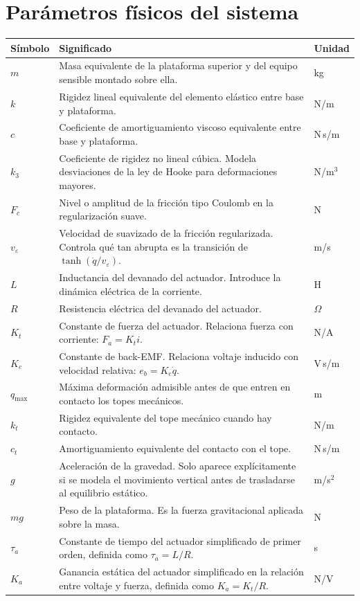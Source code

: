 \documentclass[11pt]{article}
\begin{document}
\section{Par\'ametros f\'isicos del sistema}

\begin{center}
\small
\begin{tabular}{>{\raggedright\arraybackslash}p{3.0cm} >{\raggedright\arraybackslash}p{9.0cm} >{\raggedright\arraybackslash}p{2.2cm}}
\toprule
\textbf{S\'imbolo} & \textbf{Significado} & \textbf{Unidad} \\
\midrule
$m$ & Masa equivalente de la plataforma superior y del equipo sensible montado sobre ella. & kg \\
$k$ & Rigidez lineal equivalente del elemento el\'astico entre base y plataforma. & N/m \\
$c$ & Coeficiente de amortiguamiento viscoso equivalente entre base y plataforma. & N\,s/m \\
$k_3$ & Coeficiente de rigidez no lineal c\'ubica. Modela desviaciones de la ley de Hooke para deformaciones mayores. & N/m$^3$ \\
$F_c$ & Nivel o amplitud de la fricci\'on tipo Coulomb en la regularizaci\'on suave. & N \\
$v_\varepsilon$ & Velocidad de suavizado de la fricci\'on regularizada. Controla qu\'e tan abrupta es la transici\'on de $\tanh(\dot q/v_\varepsilon)$. & m/s \\
$L$ & Inductancia del devanado del actuador. Introduce la din\'amica el\'ectrica de la corriente. & H \\
$R$ & Resistencia el\'ectrica del devanado del actuador. & $\Omega$ \\
$K_t$ & Constante de fuerza del actuador. Relaciona fuerza con corriente: $F_a=K_t i$. & N/A \\
$K_e$ & Constante de back-EMF. Relaciona voltaje inducido con velocidad relativa: $e_b=K_e\dot q$. & V\,s/m \\
$q_{\max}$ & M\'axima deformaci\'on admisible antes de que entren en contacto los topes mec\'anicos. & m \\
$k_t$ & Rigidez equivalente del tope mec\'anico cuando hay contacto. & N/m \\
$c_t$ & Amortiguamiento equivalente del contacto con el tope. & N\,s/m \\
$g$ & Aceleraci\'on de la gravedad. Solo aparece expl\'icitamente si se modela el movimiento vertical antes de trasladarse al equilibrio est\'atico. & m/s$^2$ \\
$mg$ & Peso de la plataforma. Es la fuerza gravitacional aplicada sobre la masa. & N \\
$\tau_a$ & Constante de tiempo del actuador simplificado de primer orden, definida como $\tau_a=L/R$. & s \\
$K_a$ & Ganancia est\'atica del actuador simplificado en la relaci\'on entre voltaje y fuerza, definida como $K_a=K_t/R$. & N/V \\
\bottomrule
\end{tabular}
\end{center}
\end{document}
